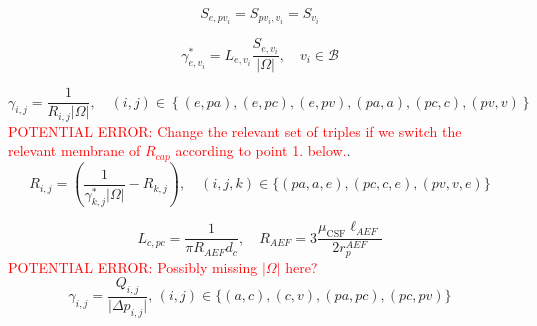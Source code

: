 \documentclass{article}
\theoremstyle{definition}
\theoremstyle{plain}
\theoremstyle{remark}
\newcommand{\ISSUE}[1]{\textcolor{red}{POTENTIAL ERROR: #1}}
\begin{document}
\begin{equation}
    S_{e, pv_i} = S_{pv_i, v_i} = S_{v_i}
\label{eq: surface area approximation} 
\end{equation}

\begin{equation}
    \gamma_{e, v_i}^* = L_{e, v_i} \frac{S_{e, v_i}}{\left|\Omega\right|}, \quad v_i \in \mathcal{B} 
\label{eq: total blood to ecs transfer} 
\end{equation}

\begin{equation}
    \gamma_{i, j} = \frac{1}{R_{i, j} \left|\Omega\right|}, \quad (i, j) \in \left\{(e, pa), (e, pc), (e, pv), (pa, a), (pc, c), (pv, v)\right\}
\label{eq: partial fluid transfer}
\end{equation}
\ISSUE{Change the relevant set of triples if we switch the relevant membrane of \( R_{cap} \) according to point 1. below.}.
\begin{equation}
    R_{i, j} = \left(\frac{1}{\gamma_{k, j}^*\left|\Omega\right|} - R_{k, j}\right), \quad (i, j, k) \in \{(pa, a, e), (pc, c, e), (pv, v, e)\}
\label{eq: partial fluid resistances} 
\end{equation}

\begin{equation}
    L_{c, pc} = \frac{1}{\pi R_{AEF} d_c}, \quad R_{AEF} = 3 \frac{\mu_{\text{CSF}} \ell_{AEF}}{2r_{p}^{AEF}}
\label{eq: hydraulic conductivity capillary level} 
\end{equation}
\ISSUE{ Possibly missing \( \lvert \Omega \rvert \) here?}
\begin{equation}
    \gamma_{i, j} = \frac{Q_{i, j}}{\lvert \Delta p_{i, j} \rvert}, \, (i, j) \in \{(a, c), (c, v), (pa, pc), (pc, pv)\}
\label{eq: convective fluid transfer connected} 
\end{equation}
\end{document}
